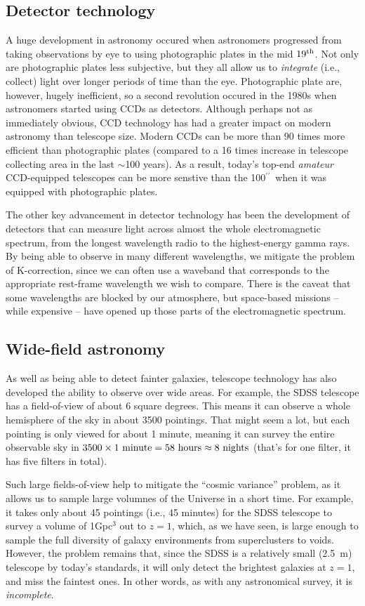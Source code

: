 \documentclass[11pt]{article}
\newcommand{\inchsign}{$^{\prime\prime}$}
\begin{document}
\subsection{Detector technology}
A huge development in astronomy occured when astronomers progressed
from taking observations by eye to using photographic plates in the
mid $19^{\rm th}$. Not only are photographic plates less subjective,
but they all allow us to {\it integrate} (i.e., collect) light over
longer periods of time than the eye. Photographic plate are, however,
hugely inefficient, so a second revolution occured in the 1980s when
astronomers started using CCDs as detectors. Although perhaps not as
immediately obvious, CCD technology has had a greater impact on modern
astronomy than telescope size. Modern CCDs can be more than $90$ times
more efficient than photographic plates (compared to a 16 times
increase in telescope collecting area in the last $\sim$100 years). As
a result, today's top-end {\it amateur} CCD-equipped telescopes can be
more senstive than the 100\inchsign\ when it was equipped with
photographic plates.

The other key advancement in detector technology has been the
development of detectors that can measure light across almost the
whole electromagnetic spectrum, from the longest wavelength radio to
the highest-energy gamma rays. By being able to observe in many
different wavelengths, we mitigate the problem of K-correction, since
we can often use a waveband that corresponds to the appropriate
rest-frame wavelength we wish to compare. There is the caveat that
some wavelengths are blocked by our atmosphere, but space-based
missions -- while expensive -- have opened up those parts of the
electromagnetic spectrum.

\subsection{Wide-field astronomy}
As well as being able to detect fainter galaxies, telescope technology
has also developed the ability to observe over wide areas. For
example, the SDSS telescope has a field-of-view of about 6 square
degrees. This means it can observe a whole hemisphere of the sky in
about 3500 pointings. That might seem a lot, but each pointing is only
viewed for about 1 minute, meaning it can survey the entire observable
sky in $3500\times1~{\rm minute}=58~{\rm hours}\approx8~{\rm nights}$
(that's for one filter, it has five filters in total).

Such large fields-of-view help to mitigate the ``cosmic variance''
problem, as it allows us to sample large volumnes of the Universe in a
short time. For example, it takes only about 45 pointings (i.e., 45
minutes) for the SDSS telescope to survey a volume of 1Gpc$^3$ out to
$z=1$, which, as we have seen, is large enough to sample the full
diversity of galaxy environments from superclusters to voids. However,
the problem remains that, since the SDSS is a relatively small (2.5~m)
telescope by today's standards, it will only detect the brightest
galaxies at $z=1$, and miss the faintest ones. In other words, as with
any astronomical survey, it is {\it incomplete}.
\end{document}
